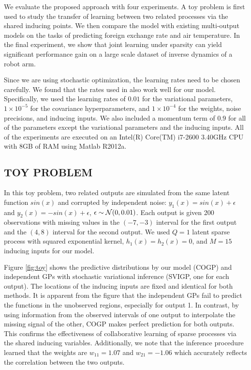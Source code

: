 We evaluate the proposed approach with four experiments.
A toy problem is first used to study the transfer of learning between two related processes via the shared inducing points.
We then compare the model with existing multi-output models on the tasks of predicting foreign exchange rate and air temperature.
In the final experiment, we show that joint learning under sparsity can yield significant performance gain on a large scale dataset of inverse dynamics of a robot arm. 

Since we are using stochastic optimization, the learning rates need to be chosen carefully.
We found that the rates used in \cite{hensmangaussian} also work well for our model.
Specifically, we used the learning rates of $0.01$ for the variational parameters, $1 \times 10^{-5}$ for the  covariance hyperparameters, and $1 \times 10^{-4}$ for the weights, noise precisions, and inducing inputs.
We also included a momentum term of $0.9$ for all of the parameters except the variational parameters and the inducing inputs.
All of the experiments are executed on an Intel(R) Core(TM) i7-2600 3.40GHz CPU with 8GB of RAM using Matlab R2012a.
%
\subsection{TOY PROBLEM}
In this toy problem, two related outputs are simulated from the same latent function $sin(x)$ and corrupted by independent noise: $y_1(x) = sin(x) + \epsilon$ and $y_2(x) = -sin(x) + \epsilon$, $\epsilon \sim \mathcal{N}(0,0.01)$.
Each output is given 200 observations with missing values in the $(-7,-3)$ interval for the first output and the $(4,8)$ interval for the second output.
We used $Q = 1$ latent sparse process with squared exponential kernel, $h_1(x) = h_2(x) = 0$, and $M = 15$ inducing inputs for our model.

Figure \ref{fig:toy} shows the predictive distributions by our model (COGP) and independent GPs with stochastic variational inference (SVIGP, one for each output).
The locations of the inducing inputs are fixed and identical for both methods.
It is apparent from the figure that the independent GPs fail to predict the functions in the unobserved regions, especially for output 1.
In contrast, by using information from the observed intervals of one output to interpolate the missing signal of the other, COGP makes perfect prediction for both outputs.
This confirms the effectiveness of collaborative learning of sparse processes via the shared inducing variables. 
Additionally, we note that the inference procedure learned that the weights are $w_{11} = 1.07$ and $w_{21} = -1.06$ which accurately reflects the correlation between the two outputs. 

